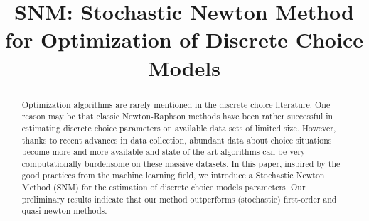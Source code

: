 \documentclass[conference]{IEEEtran}
\begin{document}
\title{SNM: Stochastic Newton Method for Optimization of Discrete Choice Models}

\author{

\and
{}
\and
{}
}

\maketitle

\begin{abstract}
Optimization algorithms are rarely mentioned in the discrete choice literature. One reason may be that classic Newton-Raphson methods have been rather successful in estimating discrete choice parameters on available data sets of limited size. However, thanks to recent advances in data collection, abundant data about choice situations become more and more available and state-of-the art algorithms can be very computationally burdensome on these massive datasets.  In this paper, inspired by the good practices from the machine learning field, we introduce a Stochastic Newton Method (SNM) for the estimation of discrete choice models parameters. Our preliminary results indicate that our method outperforms (stochastic) first-order and quasi-newton methods. 

\end{abstract}
\end{document}
